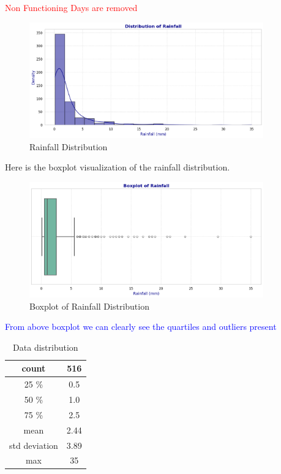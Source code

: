 \documentclass[12pt, letterpaper]{article}
\begin{document}
\textcolor{red}{Non Functioning Days are removed}

\begin{figure}[h]

    \centering
    \includegraphics[width=0.9\textwidth]{dist.png}
    \caption{Rainfall Distribution}

    
\end{figure}
Here is the boxplot visualization of the rainfall distribution.
\begin{figure}[h]
    \centering
    \includegraphics[width=0.9\textwidth]{boxplot2.png}
    \caption{Boxplot of Rainfall Distribution}
\end{figure}

\newpage

\textcolor{blue}{From above boxplot we can clearly see the quartiles and outliers present}

\begin{table}[h]
    \centering
    \begin{tabular}{|c|c|}
    \hline
    count & 516  \\ \hline
    25 \% & 0.5  \\ \hline
    50 \% & 1.0 \\ \hline
    75 \% & 2.5 \\ \hline
    mean & 2.44 \\ \hline
    std deviation & 3.89 \\ \hline
    max & 35 \\ \hline
    \end{tabular}
    \caption{Data distribution}
\end{table}
\end{document}
